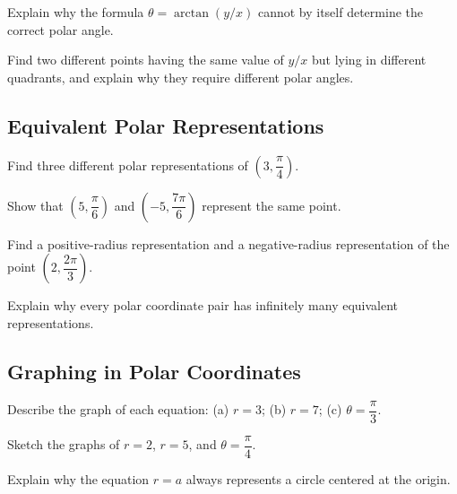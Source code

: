\begin{exercise}
Explain why the formula $\theta = \arctan(y/x)$ cannot by itself
determine the correct polar angle.
\end{exercise}

\begin{exercise}
Find two different points having the same value of $y/x$ but lying in
different quadrants, and explain why they require different polar
angles.
\end{exercise}

\subsection*{Equivalent Polar Representations}
\begin{exercise}
Find three different polar representations of $\left(3,\dfrac{\pi}{4}\right)$.
\end{exercise}

\begin{exercise}
Show that $\left(5,\dfrac{\pi}{6}\right)$ and
$\left(-5,\dfrac{7\pi}{6}\right)$ represent the same point.
\end{exercise}

\begin{exercise}
Find a positive-radius representation and a negative-radius
representation of the point $\left(2,\dfrac{2\pi}{3}\right)$.
\end{exercise}

\begin{exercise}
Explain why every polar coordinate pair has infinitely many equivalent
representations.
\end{exercise}

\subsection*{Graphing in Polar Coordinates}
\begin{exercise}
Describe the graph of each equation: (a) $r=3$; (b) $r=7$; (c)
$\theta=\dfrac{\pi}{3}$.
\end{exercise}

\begin{exercise}
Sketch the graphs of $r=2$, $r=5$, and $\theta = \dfrac{\pi}{4}$.
\end{exercise}

\begin{exercise}
Explain why the equation $r=a$ always represents a circle centered at
the origin.
\end{exercise}

